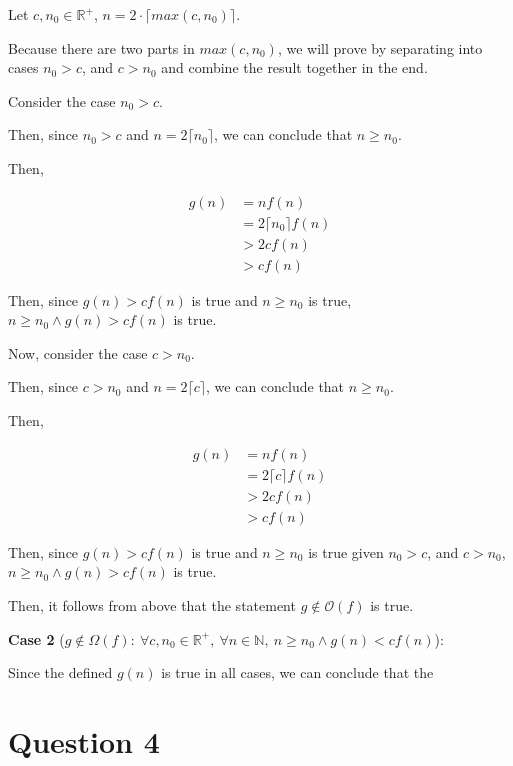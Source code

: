 \documentclass[12pt]{article}
\begin{document}
\begin{enumerate}[a.]
    \bigskip

    Let $c,n_0 \in \mathbb{R}^{+}$, $n = 2 \cdot \lceil max(c,n_0) \rceil$.

    \bigskip

    Because there are two parts in $max(c,n_0)$, we will prove by separating into
    cases $n_0 > c$, and $c > n_0$ and combine the result together in the end.

    \bigskip

    Consider the case $n_0 > c$.

    \bigskip

    Then, since $n_0 > c$ and $n = 2\lceil n_0 \rceil$, we can conclude that
    $n \geq n_0$.

    \bigskip

    Then,

    \setcounter{equation}{0}
    \begin{align}
        g(n) &= nf(n)\\
        &= 2\lceil n_0 \rceil f(n)\\
        &> 2cf(n)\\
        &> cf(n)
    \end{align}

    \bigskip

    Then, since $g(n) > cf(n)$ is true and $n \geq n_0$ is true, $n \geq n_0 \land
    g(n) > cf(n)$ is true.

    \bigskip

    Now, consider the case $c > n_0$.

    \bigskip

    Then, since $c > n_0$ and $n = 2\lceil c \rceil$, we can conclude that
    $n \geq n_0$.

    \bigskip

    Then,

    \begin{align}
        g(n) &= nf(n)\\
        &= 2\lceil c \rceil f(n)\\
        &> 2cf(n)\\
        &> cf(n)
    \end{align}

    \bigskip

    Then, since $g(n) > cf(n)$ is true and $n \geq n_0$ is true given $n_0 > c$,
    and $c > n_0$, $n \geq n_0 \land g(n) > cf(n)$ is true.

    \bigskip

    Then, it follows from above that the statement $g \notin \mathcal{O}(f)$ is
    true.

    \bigskip

    \textbf{Case 2} ($g \notin \Omega (f):\:\forall c,n_0 \in \mathbb{R}^{+},\:
    \forall n \in \mathbb{N},\:n \geq n_0 \land g(n) < cf(n)$):



    Since the defined $g(n)$ is true in all cases, we can conclude that the

\end{enumerate}

\section*{Question 4}
\end{document}
